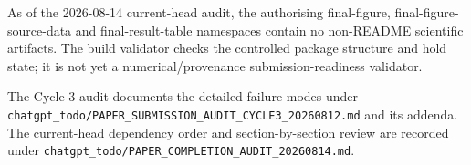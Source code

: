 As of the 2026-08-14 current-head audit, the authorising final-figure, final-figure-source-data and final-result-table namespaces contain no non-README scientific artifacts. The build validator checks the controlled package structure and hold state; it is not yet a numerical/provenance submission-readiness validator.

The Cycle-3 audit documents the detailed failure modes under \nolinkurl{chatgpt_todo/PAPER_SUBMISSION_AUDIT_CYCLE3_20260812.md} and its addenda. The current-head dependency order and section-by-section review are recorded under \nolinkurl{chatgpt_todo/PAPER_COMPLETION_AUDIT_20260814.md}.
